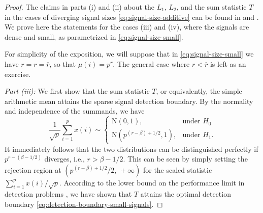 \begin{proof} The claims in parts {\rm (i)} and {\rm (ii)} about the $L_1$, $L_2$, and the sum statistic $T$ in the cases of diverging signal sizes 
\eqref{eq:signal-size-additive} can be found in \cite{fan1996test} and \cite{candes2018lecture}. We prove here the statements for the cases {\rm (iii)}
and {\rm (iv)}, where the signals are dense and small, as parametrized in \eqref{eq:signal-size-small}.

For simplicity of the exposition, we will suppose that  in \eqref{eq:signal-size-small} we have 
$\underline{r} = r = \overline{r}$, so that  $\mu(i) = p^r$.  The general case where $\underline{r}<\overline{r}$ is left as 
an exercise.

{\em Part {\rm (iii)}:} We first show that the sum statistic $T$, or equivalently, the simple arithmetic mean attains the sparse signal 
detection boundary.  By the normality and independence of the summands, we have
\begin{equation}
    \frac{1}{\sqrt{p}}\sum_{i=1}^p x(i) \sim 
    \begin{cases}
    \mathrm{N}(0, 1), & \text{under } H_0\\
    \mathrm{N}(p^{(r-\beta)+1/2}, 1), & \text{under }  H_1.
    \end{cases}
\end{equation}
It immediately follows that the two distributions can be distinguished perfectly if $p^{r-(\beta-1/2)}$ diverges, i.e., $r>\beta-1/2$. 
This can be seen by simply setting the rejection region at $(p^{(r-\beta)+1/2}/2,\,+\infty)$ for the scaled statistic $\sum_{i=1}^p x(i)/\sqrt{p} $.
According to the lower bound on the performance limit in detection problems \citep[see Theorem 8 in][]{cai2011optimal}, we have shown that $T$ attains the optimal detection boundary \eqref{eq:detection-boundary-small-signals}.


\end{proof}
